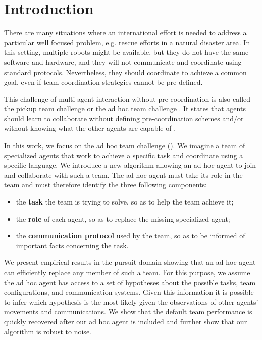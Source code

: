 \section{Introduction}


There are many situations where an international effort is needed to address a particular well focused problem, e.g. rescue efforts in a natural disaster area. In this setting, multiple robots might be available, but they do not have the same software and hardware, and they will not communicate and coordinate using standard protocols. Nevertheless, they should coordinate to achieve a common goal, even if team coordination strategies cannot be pre-defined.

This challenge of multi-agent interaction without pre-coordination is also called the pickup team challenge \cite{gil2006dynamically} or the ad hoc team challenge \cite{stone2010ad}. It states that agents should learn to collaborate without defining pre-coordination schemes and/or without knowing what the other agents are capable of \cite{bowling2005coordination,gil2006dynamically,stone2010ad}.

In this work, we focus on the ad hoc team challenge (\cite{stone2010ad}). We imagine a team of specialized agents that work to achieve a specific task and coordinate using a specific language. We introduce a new algorithm allowing an ad hoc agent to join and collaborate with such a team. The ad hoc agent must take its role in the team and must therefore identify the three following components:
%
\begin{itemize}
\item the \textbf{task} the team is trying to solve, so as to help the team achieve it;
\item the \textbf{role} of each agent, so as to replace the missing specialized agent;
\item the \textbf{communication protocol} used by the team, so as to be informed of important facts concerning the task.
\end{itemize}
%
We present empirical results in the pursuit domain showing that an ad hoc agent can efficiently replace any member of such a team. For this purpose, we assume the ad hoc agent has access to a set of hypotheses about the possible tasks, team configurations, and communication systems. Given this information it is possible to infer which hypothesis is the most likely given the observations of other agents' movements and communications. We show that the default team performance is quickly recovered after our ad hoc agent is included and further show that our algorithm is robust to noise.

